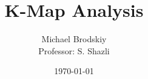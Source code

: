 


\pagestyle{fancy}

\title{K-Map Analysis}
\date{\today}
\author{Michael Brodskiy\\ \small Professor: S. Shazli}



\maketitle

\thispagestyle{fancy}

\newpage

